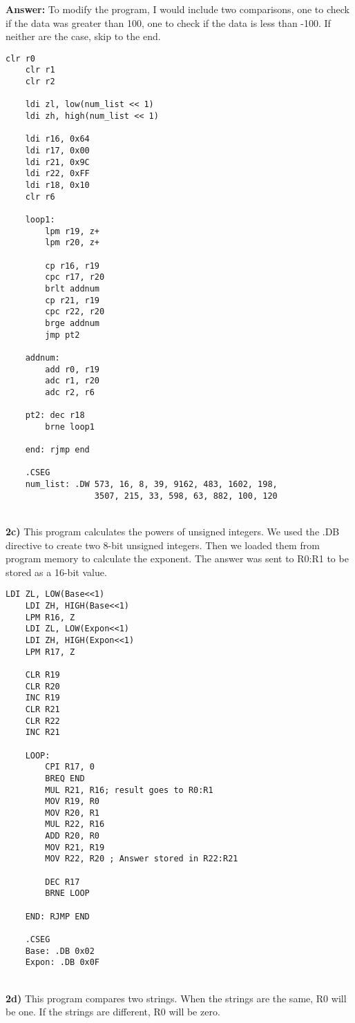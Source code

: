 \documentclass[titlepage, 12pt]{article}
\newcommand{\hi}{\hangindent=0.5in}
\begin{document}
	\hi \textbf{Answer:} To modify the program, I would include two comparisons, one to check if the data was greater than 100, one to check if the data is less than -100. If neither are the case, skip to the end.
	\setlength\parindent{0.5in}
	\begin{lstlisting}[style=AVR, xleftmargin=0.5in]
	clr r0
	clr r1
	clr r2
	
	ldi zl, low(num_list << 1)
	ldi zh, high(num_list << 1)
	
	ldi r16, 0x64
	ldi r17, 0x00
	ldi r21, 0x9C
	ldi r22, 0xFF
	ldi r18, 0x10
	clr r6
	
	loop1:
		lpm r19, z+
		lpm r20, z+
		
		cp r16, r19
		cpc r17, r20
		brlt addnum
		cp r21, r19
		cpc r22, r20
		brge addnum
		jmp pt2
	
	addnum:
		add r0, r19
		adc r1, r20
		adc r2, r6
	
	pt2: dec r18
		brne loop1
	
	end: rjmp end
	
	.CSEG
	num_list: .DW 573, 16, 8, 39, 9162, 483, 1602, 198, 
				  3507, 215, 33, 598, 63, 882, 100, 120
	\end{lstlisting}~\\
	
	\noindent\textbf{2c)} This program calculates the powers of unsigned integers. We used the .DB directive to create two 8-bit unsigned integers. Then we loaded them from program memory to calculate the exponent. The answer was sent to R0:R1 to be stored as a 16-bit value. 
	
	\begin{lstlisting}[style=AVR]
	LDI ZL, LOW(Base<<1) 
	LDI ZH, HIGH(Base<<1) 
	LPM R16, Z 
	LDI ZL, LOW(Expon<<1) 
	LDI ZH, HIGH(Expon<<1) 
	LPM R17, Z 
	
	CLR R19 
	CLR R20 
	INC R19 
	CLR R21 
	CLR R22 
	INC R21 
	
	LOOP: 
		CPI R17, 0 
		BREQ END 
		MUL R21, R16; result goes to R0:R1 
		MOV R19, R0 
		MOV R20, R1 
		MUL R22, R16 
		ADD R20, R0 
		MOV R21, R19 
		MOV R22, R20 ; Answer stored in R22:R21 
	
		DEC R17 
		BRNE LOOP 
	
	END: RJMP END 
	
	.CSEG 
	Base: .DB 0x02 
	Expon: .DB 0x0F 
	\end{lstlisting}~\\
	
	\noindent\textbf{2d)} This program compares two strings. When the strings are the same, R0 will be one. If the strings are different, R0 will be zero. 
	
\end{document}
